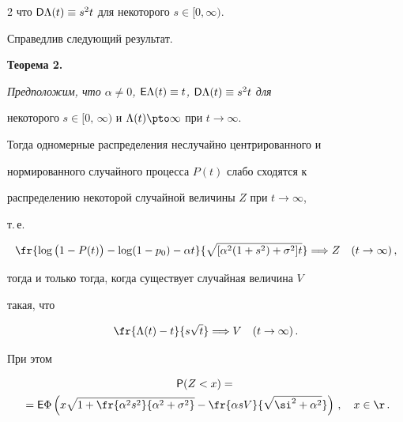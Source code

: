 \begin{multicols}{2}
что ${\sf D}\Lambda(t)\equiv s^2t$ для некоторого $s\in[0,\infty)$.


Справедлив следующий результат.





\smallskip





\noindent


{\textbf{Теорема 2.}} {\it Предположим, что $\alpha\neq 0$, ${\sf


E}\Lambda(t) \equiv t$,  ${\sf D}\Lambda(t)\equiv s^2t$ для


некоторого $s\in[0,\,\infty)$ и $\Lambda(t)\pto\infty$ при $t\to\infty$.


Тогда одномерные распределения неслучайно центрированного и


нормированного случайного процесса $P(t)$ слабо сходятся к


распределению некоторой случайной величины $Z$ при $t\to\infty$,


т.\,е.\


$$


\fr{\log \big(1-P(t)\big)-\log (1-p_0)-\alpha


t}{\sqrt{[\alpha^2(1+s^2)+\sigma^2]t}}\Longrightarrow Z\ \ \


(t\to\infty)\,,


$$


тогда и только тогда, когда существует случайная величина $V$


такая, что


$$


\fr{\Lambda(t)-t}{s\sqrt t}\Longrightarrow V\ \ \ (t\to\infty)\,.


$$


При этом}


\begin{multline*}


{\sf P}(Z<x)={}\\


{}={\sf


E}\Phi\left(x\sqrt{1+\fr{\alpha^2s^2}{\alpha^2+\sigma^2}}-\fr{\alpha


sV}{\sqrt{\si^2+\alpha^2}}\right )\,,\ \ \ x\in\r\,.


\end{multline*}





\smallskip






\end{multicols}
